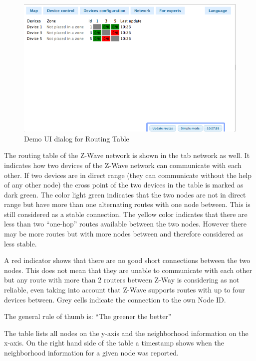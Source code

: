 \begin{figure} 
\begin{center}
\includegraphics[scale=0.5]{pics/routingtable.png}
\caption{Demo UI dialog for Routing Table}
\label{c2:demorouting} 
\end{center} \end{figure}

The routing table of the Z-Wave network is shown in the tab network as well. It indicates how two devices of the Z-Wave network can communicate with each other. 
If two devices are in direct range (they can communicate without the help of any other node) the cross point of the two devices in the table is marked as dark green. 
The color light green indicates that the two nodes are not in direct range but have more than one alternating routes with one node between. This is still considered 
as a stable connection.
The yellow color indicates that there are less than two “one-hop” routes available between the two nodes. However there may be more routes but with more nodes
 between and therefore considered as less stable.

A red indicator shows that there are no good short connections between the two nodes. This does not mean that they are unable to communicate with each other 
 but any route with more than 2 routers between Z-Way is considering as not reliable, even taking into account that Z-Wave supports routes with up to four devices 
 between. Grey cells indicate the connection to the own Node ID. 

The general rule of thumb is: “The greener the better”
 
The table lists all nodes on the y-axis and the neighborhood information on the x-axis. On the right hand side of the table a timestamp shows when the neighborhood
 information for a given node was reported.   

